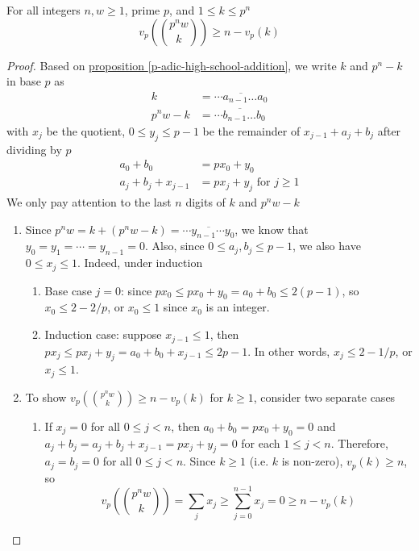 \documentclass{treatise}
\begin{document}
\begin{lemma} \label{val-bino-prime-pow-ineq}
For all integers $n, w \geq 1$, prime $p$, and $1 \leq k \leq p^n$
$$v_p \left( {p^n w \choose k} \right) \geq n - v_p (k)$$
\end{lemma}
\begin{proof}
Based on \hyperref[p-adic-high-school-addition]{proposition \ref*{p-adic-high-school-addition}}, we write $k$ and $p^n - k$ in base $p$ as
\begin{align*}
k & = \overline{\cdots a_{n - 1} \hdots a_0} \\
p^n w - k & = \overline{\cdots b_{n - 1} \hdots b_0}
\end{align*}
with $x_j$ be the quotient, $0 \leq y_j \leq p - 1$ be the remainder of $x_{j - 1} + a_j + b_j$ after dividing by $p$
\begin{align*}
a_0 + b_0 & = p x_0 + y_0 \\
a_j + b_j + x_{j - 1} & = p x_j + y_j \mbox{ for } j \geq 1
\end{align*}
We only pay attention to the last $n$ digits of $k$ and $p^n w - k$
\begin{enumerate}
	\item Since $p^n w = k + (p^n w - k) = \overline{\cdots y_{n - 1} \cdots y_0}$, we know that $y_0 = y_1 = \cdots = y_{n - 1} = 0$. Also, since $0 \leq a_j, b_j \leq p - 1$, we also have $0 \leq x_j \leq 1$. Indeed, under induction
	\begin{enumerate}
		\item Base case $j = 0$: since $p x_0 \leq p x_0 + y_0 = a_0 + b_0 \leq 2(p - 1)$, so $x_0 \leq 2 - 2/p$, or $x_0 \leq 1$ since $x_0$ is an integer.
		\item Induction case: suppose $x_{j - 1} \leq 1$, then $p x_j \leq p x_j + y_j = a_0 + b_0 + x_{j - 1} \leq 2p -1$. In other words, $x_j \leq 2 - 1/p$, or $x_j \leq 1$.
	\end{enumerate}
	\item To show $v_p \left( {p^n w \choose k} \right) \geq n - v_p (k)$ for $k \geq 1$, consider two separate cases
	\begin{enumerate}
		\item If $x_j = 0$ for all $0 \leq j < n$, then $a_0 + b_0 = p x_0 + y_0 = 0$ and $a_j + b_j = a_j + b_j + x_{j - 1} = p x_j + y_j = 0$ for each $1 \leq j < n$. Therefore, $a_j = b_j = 0$ for all $0 \leq j < n$. Since $k \geq 1$ (i.e. $k$ is non-zero), $v_p (k) \geq n$, so
		$$v_p \left( {p^n w \choose k} \right) = \sum_j x_j \geq \sum_{j = 0}^{n - 1} x_j = 0 \geq n - v_p (k)$$

\end{enumerate}
\end{enumerate}
\end{proof}
\end{document}
